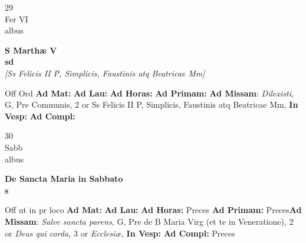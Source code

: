 \documentclass[10pt, openany]{book}
\begin{document}
        \begin{center}
            \begin{minipage}{3.5in}
                \vspace{2em}
                \begin{minipage}{0.5in}
                    {\Huge 29} \\
                    {\normalsize Fer VI} \\
                    {\normalsize albus}
                \end{minipage}
                \begin{minipage}{3.0in}
                    \textbf{ \large S Marthæ V \\
                    \textnormal{\normalsize sd}} \\ \textit{[Ss Felicis II P, Simplicis, Faustinis atq Beatricae Mm]} \\ 
                \end{minipage}
                \begin{justify}Off Ord
                    \textbf{Ad Mat: }
                    \textbf{Ad Lau: }
                    \textbf{Ad Horas: }
                    \textbf{Ad Primam: }\textbf{Ad Missam}: \textit{Dilexisti,} G, Pre Communis, 2 or Ss Felicis II P, Simplicis, Faustinis atq Beatricae Mm,  
                    \textbf{In Vesp: }
                    \textbf{Ad Compl: }
                \end{justify}
            \end{minipage}
        \end{center}
    
        \begin{center}
            \begin{minipage}{3.5in}
                \vspace{2em}
                \begin{minipage}{0.5in}
                    {\Huge 30} \\
                    {\normalsize Sabb} \\
                    {\normalsize albus}
                \end{minipage}
                \begin{minipage}{3.0in}
                    \textbf{ \large De Sancta Maria in Sabbato \\
                    \textnormal{\normalsize s}} \\ 
                \end{minipage}
                \begin{justify}Off ut in pr loco
                    \textbf{Ad Mat: }
                    \textbf{Ad Lau: }
                    \textbf{Ad Horas: }Preces
                    \textbf{Ad Primam: }Preces\textbf{Ad Missam}: \textit{Salve sancta parens,} G, Pre de B Maria Virg (et te in Veneratione), 2 or \textit{Deus qui corda,} 3 or \textit{Ecclesiæ,}  
                    \textbf{In Vesp: }
                    \textbf{Ad Compl: }Preces
                \end{justify}
            \end{minipage}
        \end{center}
    
\end{document}

